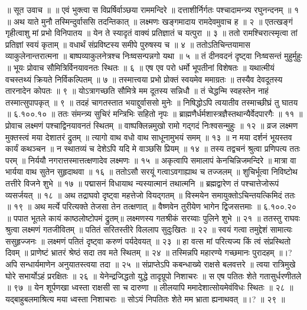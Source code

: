 ॥ सूत उवाच ॥ ॥
एवं भुक्त्वा स विप्रर्षिर्वाञ्छया राममन्दिरे ॥
दत्ताशीर्निर्गतः पश्चादामन्त्र्य रघुनन्दनम् ॥ १ ॥
अथ याते मुनौ तस्मिन्दुर्वाससि तदन्तिकात् ॥
लक्ष्मणः खङ्गमादाय रामदेवमुवाच ह ॥ २ ॥
एतत्खङ्गं गृहीत्वाशु मां प्रभो विनिपातय ॥
येन ते स्यादृतं वाक्यं प्रतिज्ञातं च यत्पुरा ॥ ३ ॥
ततो रामश्चिरात्स्मृत्वा तां प्रतिज्ञां स्वयं कृताम् ॥
वधार्थं संप्रविष्टस्य समीपे पुरुषस्य च ॥ ४ ॥
ततोऽतिचिन्तयामास व्याकुलेनान्तरात्मना ॥
बाष्पव्याकुलनेत्रश्च निःष्वसन्पन्नगो यथा ॥ ५ ॥
तं दीनवदनं दृष्ट्वा निःष्वसन्तं मुहुर्मुहुः ॥
भूयः प्रोवाच सौमित्रिर्विनयावनतः स्थितः ॥ ६ ॥
एष एव परो धर्मो भूपतीनां विशेषतः ॥
यथात्मीयं वचस्तथ्यं क्रियते निर्विकल्पितम् ॥ ७ ॥
तस्मात्त्वया प्रभो प्रोक्तं स्वयमेव ममाग्रतः ॥
तस्यैव देवदूतस्य तारनादेन कोपतः ॥ ९ ॥
योऽत्रागच्छति सौमित्रे मम दूतस्य सन्निधौ ॥
तं चेद्धन्मि स्वहस्तेन नाहं तस्मात्सुपापकृत् ॥ ९ ॥
तदहं चागतस्तात भयाद्दुर्वाससो मुनेः ॥
निषिद्धोऽपि त्वयातीव तस्माच्छीघ्रं तु घातय ॥ ६.१००.१० ॥
ततः संमन्त्र्य सुचिरं मन्त्रिभिः सहितो नृपः ॥
ब्राह्मणैर्धर्मशास्त्रज्ञैस्तथान्यैर्वेदपारगैः ॥ ११ ॥
प्रोवाच लक्ष्मणं पश्चाद्विनयावनतं स्थितम् ॥
वाष्पक्लिन्नमुखो रामो गद्गदं निःश्वसन्मुहुः ॥ १२ ॥
व्रज लक्ष्मण मुक्तस्त्वं मया देशातरं द्रुतम् ॥
त्यागो वाथ वधो वाथ साधूनामुभयं समम् ॥ १३ ॥
न मया दर्शनं भूयस्तव कार्यं कथञ्चन ॥
न स्थातव्यं च देशेऽपि यदि मे वाञ्छसि प्रियम् ॥ १४ ॥
तस्य तद्वचनं श्रुत्वा प्रणिपत्य ततः परम् ॥
निर्ययौ नगरात्तस्मात्तत्क्षणादेव लक्ष्मणः ॥ १५ ॥
अकृत्वापि समालापं केनचिन्निजमन्दिरे ॥
मात्रा वा भार्यया वाथ सुतेन सुहृदाथवा ॥ १६ ॥
ततोऽसौ सरयूं गत्वाऽवगाह्याथ च तज्जलम् ॥
शुचिर्भूत्वा निविष्टोथ तत्तीरे विजने शुभे ॥ १७ ॥
पद्मासनं विधायाथ न्यस्यात्मानं तथात्मनि ॥
ब्रह्मद्वारेण तं पश्चात्तेजोरूपं व्यसर्जयत् ॥ १८ ॥
अथ तद्राघवो दृष्ट्वा महत्तेजो वियद्गतम् ॥
विस्मयेन समायुक्तोऽचिन्तयत्किमिदं ततः ॥ १९ ॥
अथ मर्त्ये परित्यक्ते तेजसा तेन तत्क्षणात् ॥
वैष्णवेन तुरीयेण भागेन द्विजसत्तमाः ॥ ६.१००.२० ॥
पपात भूतले कायं काष्ठलोष्टोपमं द्रुतम्॥
लक्ष्मणस्य गतश्रीकं सरय्वाः पुलिने शुभे ॥ २१ ॥
ततस्तु राघवः श्रुत्वा लक्ष्मणं गतजीवितम् ॥
पतितं सरितस्तीरे विललाप सुदुःखितः ॥ २२ ॥
स्वयं गत्वा तमुद्देशं सामात्यः ससुहृज्जनः ॥
लक्ष्मणं पतितं दृष्ट्वा करुणं पर्यदेवयत् ॥ २३ ॥
हा वत्स मां परित्यज्य किं त्वं संप्रस्थितो दिवम् ॥
प्राणेष्टं भ्रातरं श्रेष्ठं सदा तव मते स्थितम् ॥ २४ ॥
तस्मिन्नपि महारण्ये गच्छमानः पुरादहम् ॥।?
अपि सन्धार्यमाणेन अनुयातस्त्वया तदा ॥ २५ ॥
संप्राप्तेऽपि कबन्धाख्ये राक्षसे बलवत्तरे ॥
त्वया रात्रिमुखे घोरे सभार्योऽहं प्ररक्षितः ॥ २६ ॥
येनेन्द्रजिद्धतो युद्धे तादृग्रूपो निशाचरः ॥
स एष पतितः शेते गतासुर्धरणीतले ॥ ९७ ॥
येन शूर्पणखा ध्वस्ता राक्षसी सा च दारुणा ॥
लीलयापि ममादेशात्सोयमेवंविधः स्थितः ॥ २८ ॥
यद्बाहुबलमाश्रित्य मया ध्वस्ता निशाचराः ॥
सोऽयं निपतितः शेते मम भ्राता ह्यनाथवत् ॥।? ॥ २९ ॥
